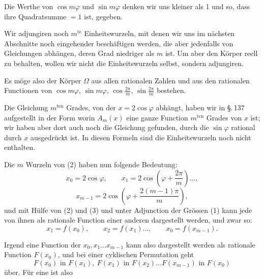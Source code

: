 Die Werthe von $\cos m\varphi$ und $\sin m\varphi$ denken wir uns kleiner als 1 und so, dass ihre Quadratsumme $= 1$ ist, gegeben.

Wir adjungiren noch $m^{\text{te}}$ Einheitswurzeln, mit denen wir uns im nächsten Abschnitte noch eingehender beschäftigen werden, die aber jedenfalls von Gleichungen abhängen, deren Grad niedriger als $m$ ist. Um aber den Körper reell zu behalten, wollen wir nicht die Einheitswurzeln selbst, sondern
adjungiren.

Es möge also der Körper $\Omega$ aus allen rationalen Zahlen und aus den rationalen Functionen von $\cos m\varphi$, $\sin m\varphi$, $\cos\frac{2\pi}{m}$, $\sin\frac{2\pi}{m}$ bestehen.

Die Gleichung $m^{\text{ten}}$ Grades, von der $x = 2\cos\varphi$ abhängt, haben wir in \S.\,137 aufgestellt in der Form
worin $A_m(x)$ eine ganze Function $m^{\text{ten}}$ Grades von $x$ ist; wir haben aber dort auch noch die Gleichung
gefunden, durch die $\sin\varphi$ rational durch $x$ ausgedrückt ist. In diesen Formeln sind die Einheitswurzeln noch nicht enthalten.

Die $m$ Wurzeln von (2) haben nun folgende Bedeutung:
\[
x_0 = 2\cos\varphi, \qquad x_1 = 2\cos\left(\varphi + \frac{2\pi}{m}\right)\dots,
\]
\[
x_{m-1} = 2\cos\left(\varphi + \frac{2(m-1)\pi}{m}\right),
\]
und mit Hülfe von (2) und (3) und unter Adjunction der Grössen (1) kann jede von ihnen als rationale Function einer anderen dargestellt werden, und zwar so:
\[
x_1 = f(x_0), \qquad x_2 = f(x_1)\dots, \qquad x_0 = f(x_{m-1}).
\]

Irgend eine Function der $x_0, x_1 \dots x_{m-1}$ kann also dargestellt werden als rationale Function $F(x_0)$, und bei einer cyklischen Permutation geht
\[
F(x_0) \text{ in } F(x_1), \ F(x_1) \text{ in } F(x_2) \dots F(x_{m-1}) \text{ in } F(x_0)
\]
über. Für eine  ist also
